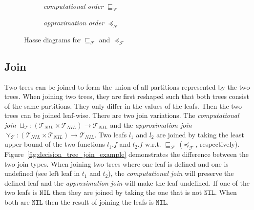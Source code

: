 \documentclass[11pt,a4paper,titlepage]{article}
\theoremstyle{definition}
\begin{document}
\begin{figure}
    \begin{subfigure}[b]{0.5\textwidth}
        \centering
        \caption{\textit{computational order} $\sqsubseteq_{\mathcal{F}}$}
    \end{subfigure}
    \begin{subfigure}[b]{0.5\textwidth}
        \centering
        \caption{\textit{approximation order} $\preceq_{\mathcal{F}}$}
    \end{subfigure}
    \caption{Hasse diagrams for $\sqsubseteq_{\mathcal{F}}$ and $\preceq_{\mathcal{F}}$
    } 
    \label{fig:function_comp_approx_hasse}
\end{figure}

\subsection{Join}\label{sec:tree_join}
Two trees can be joined to form the union of all partitions represented by the two trees. When joining two trees, they are first reshaped such
that both trees consist of the same partitions. They only differ in the values of the leafs. Then the two trees can be joined leaf-wise. 
There are two join variations. 
The \textit{computational join} $\sqcup_{\mathcal{T}} \colon (\mathcal{T}_{NIL} \times \mathcal{T}_{NIL}) \rightarrow \mathcal{T}_{NIL}$
and the \textit{approximation join} $\curlyvee_{\mathcal{T}} \colon (\mathcal{T}_{NIL} \times \mathcal{T}_{NIL}) \rightarrow \mathcal{T}_{NIL}$. 
Two leafs $l_1$ and $l_2$ are joined by taking the least upper bound of the two functions $l_1.f$ and $l_2.f$ 
w.r.t. $\sqsubseteq_{\mathcal{F}}$ ($\preceq_{\mathcal{F}}$, respectively).
Figure~\ref{fig:decision_tree_join_example} demonstrates the difference between the two join types. 
When joining two trees where one leaf is defined and one is undefined 
(see left leaf in $t_1$ and $t_2$), the \textit{computational join} will preserve the defined leaf
and the \textit{approximation join} will make the leaf undefined. If one of the two leafs is $\mathtt{NIL}$ then they are joined by taking the one
that is not $\mathtt{NIL}$. When both are $\mathtt{NIL}$ then the result of joining the leafs is $\mathtt{NIL}$.
\end{document}
